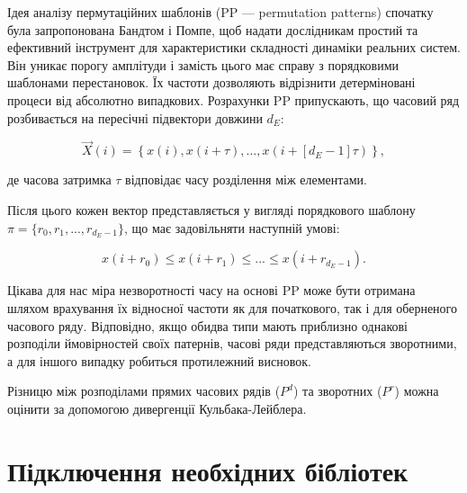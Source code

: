 \documentclass[
  letterpaper,
]{report}
\begin{document}
Ідея аналізу пермутаційних шаблонів (PP --- permutation patterns)
спочатку була запропонована Бандтом і Помпе, щоб надати дослідникам
простий та ефективний інструмент для характеристики складності динаміки
реальних систем. Він уникає порогу амплітуди і замість цього має справу
з порядковими шаблонами перестановок. Їх частоти дозволяють відрізнити
детерміновані процеси від абсолютно випадкових. Розрахунки PP
припускають, що часовий ряд розбивається на пересічні підвектори довжини
\(d_{E}\):

\[ 
\vec{X}(i) = \left\{ x(i), x(i+\tau), ... , x(i+[d_{E}-1]\tau) \right\}, 
\]

де часова затримка \(\tau\) відповідає часу розділення між елементами.

Після цього кожен вектор представляється у вигляді порядкового шаблону
\(\pi = \{ r_0, r_1, ... , r_{d_{E}-1} \}\), що має задовільняти
наступній умові:

\[ 
x(i+r_0) \leq x(i+r_1) \leq ... \leq x(i+r_{d_{E}-1}).
\]

Цікава для нас міра незворотності часу на основі PP може бути отримана
шляхом врахування їх відносної частоти як для початкового, так і для
оберненого часового ряду. Відповідно, якщо обидва типи мають приблизно
однакові розподіли ймовірностей своїх патернів, часові ряди
представляються зворотними, а для іншого випадку робиться протилежний
висновок.

Різницю між розподілами прямих часових рядів (\(P^{d}\)) та зворотних
(\(P^{r}\)) можна оцінити за допомогою дивергенції Кульбака-Лейблера.

\hypertarget{ux43fux456ux434ux43aux43bux44eux447ux435ux43dux43dux44f-ux43dux435ux43eux431ux445ux456ux434ux43dux438ux445-ux431ux456ux431ux43bux456ux43eux442ux435ux43a}{%
\section{Підключення необхідних
бібліотек}\label{ux43fux456ux434ux43aux43bux44eux447ux435ux43dux43dux44f-ux43dux435ux43eux431ux445ux456ux434ux43dux438ux445-ux431ux456ux431ux43bux456ux43eux442ux435ux43a}}
\end{document}

